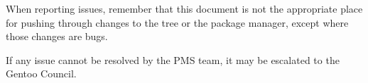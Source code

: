 When reporting issues, remember that this document is not the appropriate place for pushing
through changes to the tree or the package manager, except where those changes are bugs.

If any issue cannot be resolved by the PMS team, it may be escalated to the Gentoo Council.


